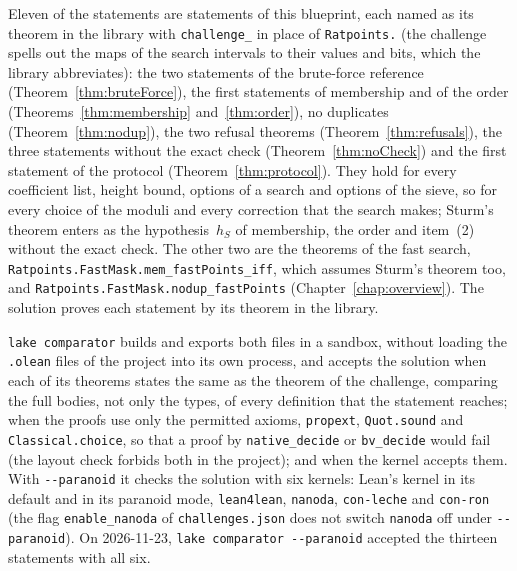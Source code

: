 Eleven of the statements are statements of this blueprint, each named as its theorem in the library
with \verb|challenge_| in place of \verb|Ratpoints.| (the challenge spells out the maps of the
search intervals to their values and bits, which the library abbreviates): the two statements of the
brute-force reference (Theorem~\ref{thm:bruteForce}), the first statements of membership and of the
order (Theorems~\ref{thm:membership} and~\ref{thm:order}), no duplicates (Theorem~\ref{thm:nodup}),
the two refusal theorems (Theorem~\ref{thm:refusals}), the three statements without the exact check
(Theorem~\ref{thm:noCheck}) and the first statement of the protocol (Theorem~\ref{thm:protocol}).
They hold for every coefficient list, height bound, options of a search and options of the sieve, so
for every choice of the moduli and every correction that the search makes; Sturm's theorem enters as
the hypothesis~$h_S$ of membership, the order and item~(2) without the exact check. The other two
are the theorems of the fast search, \verb|Ratpoints.FastMask.mem_fastPoints_iff|, which assumes
Sturm's theorem too, and \verb|Ratpoints.FastMask.nodup_fastPoints| (Chapter~\ref{chap:overview}). The solution proves each
statement by its theorem in the library.

\verb|lake comparator| builds and exports both files in a sandbox, without loading the \verb|.olean|
files of the project into its own process, and accepts the solution when each of its theorems states
the same as the theorem of the challenge, comparing the full bodies, not only the types, of every
definition that the statement reaches; when the proofs use only the permitted axioms,
\verb|propext|, \verb|Quot.sound| and \verb|Classical.choice|, so that a proof by
\verb|native_decide| or \verb|bv_decide| would fail (the layout check forbids both in the project);
and when the kernel accepts them. With \verb|--paranoid| it checks the solution with six kernels:
Lean's kernel in its default and in its paranoid mode, \verb|lean4lean|, \verb|nanoda|,
\verb|con-leche| and \verb|con-ron| (the flag \verb|enable_nanoda| of \verb|challenges.json| does
not switch \verb|nanoda| off under \verb|--paranoid|). On 2026-11-23,
\verb|lake comparator --paranoid| accepted the thirteen statements with all six.

